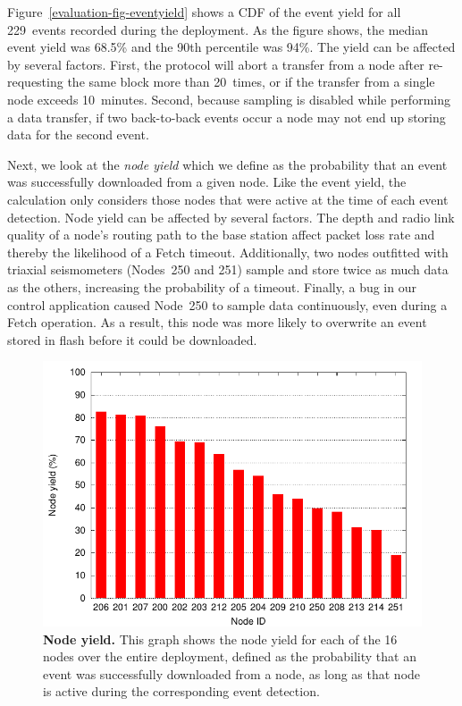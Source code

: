 Figure~\ref{evaluation-fig-eventyield} shows a CDF of the event yield for all
229~events recorded during the deployment. As the figure shows, the median
event yield was 68.5\% and the 90th percentile was 94\%. The yield can be
affected by several factors. First, the protocol will abort a transfer from a
node after re-requesting the same block more than 20~times, or if the
transfer from a single node exceeds 10~minutes. Second, because sampling is
disabled while performing a data transfer, if two back-to-back events occur a
node may not end up storing data for the second event.

Next, we look at the \textit{node yield} which we define as the probability
that an event was successfully downloaded from a given node. Like the event
yield, the calculation only considers those nodes that were active at the
time of each event detection. Node yield can be affected by several factors.
The depth and radio link quality of a node's routing path to the base station
affect packet loss rate and thereby the likelihood of a Fetch timeout.
Additionally, two nodes outfitted with triaxial seismometers (Nodes~250 and
251) sample and store twice as much data as the others, increasing the
probability of a timeout. Finally, a bug in our control application caused
Node~250 to sample data continuously, even during a Fetch operation. As a
result, this node was more likely to overwrite an event stored in flash
before it could be downloaded.

\begin{figure}[t]
\begin{center}
\includegraphics[width=\hsize]{./3-evaluation/figs/nodeyield.pdf}
\end{center}

\caption{\textbf{Node yield.} This graph shows the node yield for each of the
16 nodes over the entire deployment, defined as the probability that an event
was successfully downloaded from a node, as long as that node is active
during the corresponding event detection.}

\label{evaluation-fig-nodeyield}
\end{figure}

